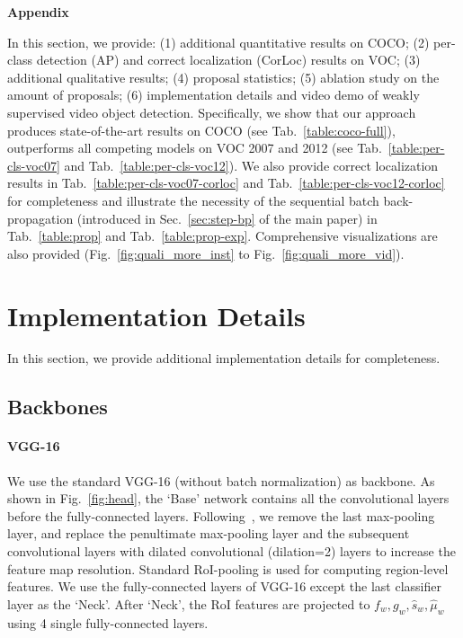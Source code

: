 \documentclass[10pt,twocolumn,letterpaper]{article}
\begin{document}
\appendix
{\centering \Large \textbf{Appendix}}
\vspace{1em}

In this section, we provide:  (1) additional quantitative results on COCO; (2) per-class detection (AP) and correct localization (CorLoc) results on VOC; (3) additional qualitative results; (4) proposal statistics; (5) ablation study on the amount of proposals;  (6) implementation details and video demo of weakly supervised video object detection. Specifically, we show that our approach produces state-of-the-art results on COCO (see Tab.~\ref{table:coco-full}), outperforms all competing models on VOC 2007 and 2012 (see Tab.~\ref{table:per-cls-voc07} and Tab.~\ref{table:per-cls-voc12}). We also provide correct localization results in Tab.~\ref{table:per-cls-voc07-corloc} and Tab.~\ref{table:per-cls-voc12-corloc} for completeness and illustrate the necessity of the sequential batch back-propagation (introduced in  Sec.~\ref{sec:step-bp} of the main paper) in Tab.~\ref{table:prop} and Tab.~\ref{table:prop-exp}. Comprehensive visualizations are also  provided (Fig.~\ref{fig:quali_more_inst} to Fig.~\ref{fig:quali_more_vid}).

\section{Implementation Details}
\label{app:implement}
In this section, we provide additional implementation details for completeness. 
\subsection{Backbones}
\paragraph{VGG-16} We use the standard VGG-16 (without batch normalization) as backbone.
As shown in Fig.~\ref{fig:head}, the `Base' network contains all the convolutional layers before the fully-connected layers. Following~\cite{tang2017multiple}, we remove the last max-pooling layer, and replace the penultimate max-pooling layer and the subsequent convolutional layers with dilated convolutional (dilation=2) layers to increase the feature map  resolution. Standard RoI-pooling is used for computing region-level features. We use the fully-connected layers of VGG-16 except the last classifier layer as the `Neck'. After `Neck', the RoI features are projected to $f_w, g_w, \hat{s}_w, \hat{\mu}_w$ using 4 single fully-connected layers. 
\end{document}
